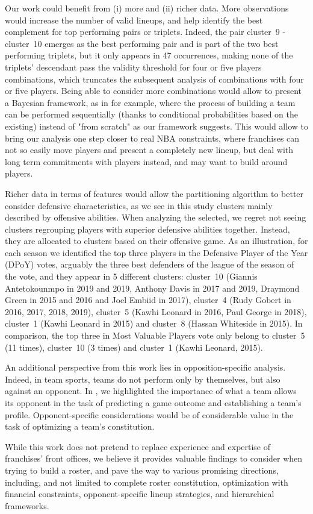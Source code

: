 Our work could benefit from (i) more and (ii) richer data.
More observations would increase the number of valid lineups, and help identify the best complement for top performing pairs or triplets.
Indeed, the pair cluster~9 - cluster~10 emerges as the best performing pair and is part of the two best performing triplets, but it only appears in 47 occurrences, making none of the triplets' descendant pass the validity threshold for four or five players combinations, which truncates the subsequent analysis of combinations with four or five players.
Being able to consider more combinations would allow to present a Bayesian framework, as in \cite{calvo_selecting_2025} for example, where the process of building a team can be performed sequentially (thanks to conditional probabilities based on the existing) instead of "from scratch" as our framework suggests.
This would allow to bring our analysis one step closer to real NBA constraints, where franchises can not so easily move players and present a completely new lineup, but deal with long term commitments with players instead, and may want to build around players.

Richer data in terms of features would allow the partitioning algorithm to better consider defensive characteristics, as we see in this study clusters mainly described by offensive abilities.
When analyzing the selected, we regret not seeing clusters regrouping players with superior defensive abilities together. 
Instead, they are allocated to clusters based on their offensive game. 
As an illustration, for each season we identified the top three players in the Defensive Player of the Year (DPoY) votes, arguably the three best defenders of the league of the season of the vote, and they appear in 5 different clusters: cluster~10 (Giannis Antetokounmpo in 2019 and 2019, Anthony Davis in 2017 and 2019, Draymond Green in 2015 and 2016 and Joel Embiid in 2017), cluster~4 (Rudy Gobert in 2016, 2017, 2018, 2019), cluster~5 (Kawhi Leonard in 2016, Paul George in 2018), cluster~1 (Kawhi Leonard in 2015) and cluster~8 (Hassan Whiteside in 2015).
In comparison, the top three in Most Valuable Players vote only belong to cluster~5 (11 times), cluster~10 (3 times) and cluster~1 (Kawhi Leonard, 2015).

An additional perspective from this work lies in opposition-specific analysis.
Indeed, in team sports, teams do not perform only by themselves, but also against an opponent. 
In \cite{Odet2025AML}, we highlighted the importance of what a team allows its opponent in the task of predicting a game outcome and establishing a team's profile.
Opponent-specific considerations would be of considerable value in the task of optimizing a team's constitution.

While this work does not pretend to replace experience and expertise of franchises' front offices, we believe it provides valuable findings to consider when trying to build a roster, and pave the way to various promising directions, including, and not limited to complete roster constitution, optimization with financial constraints, opponent-specific lineup strategies, and hierarchical frameworks.
